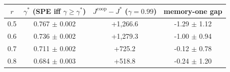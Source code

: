\begin{tabular}{cccc}
\toprule
$r$ & $\gamma^*$ (SPE iff $\gamma\ge\gamma^*$) & $J^{\text{coop}}-J^{*}$ ($\gamma=0.99$) & memory-one gap \\
\midrule
0.5 & 0.767 $\pm$ 0.002 & +1{,}266.6 & -1.29 $\pm$ 1.12 \\
0.6 & 0.736 $\pm$ 0.002 & +1{,}279.3 & -1.00 $\pm$ 0.94 \\
0.7 & 0.711 $\pm$ 0.002 & +725.2 & -0.12 $\pm$ 0.78 \\
0.8 & 0.684 $\pm$ 0.003 & +518.8 & -0.24 $\pm$ 1.20 \\
\bottomrule
\end{tabular}
